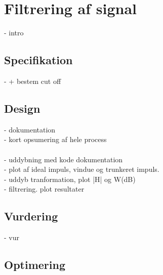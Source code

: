 \chapter{Filtrering af signal}
- intro 
\section{Specifikation}
-  + bestem cut off

\section{Design}
- dokumentation\\
- kort opsumering af hele process\\ 
\\


- uddybning med kode dokumentation\\
- plot af ideal impuls, vindue og trunkeret impuls.\\ 
- uddyb tranformation, plot |H| og W(dB)\\
- filtrering. plot resultater \\

\section{Vurdering}
- vur   

\section{Optimering}
   
